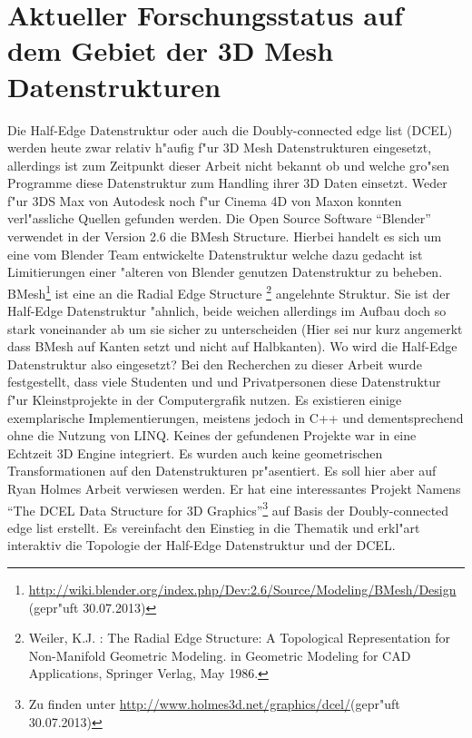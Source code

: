 \documentclass[pagesize, paper=a4, fontsize=12pt,titlepage=true, headings=small, headnosepline, abstractoff, liststotoc, nochapterprefix, plainheadsepline]{scrreprt}
\newcommand{\HES}{Half-Edge Datenstruktur }
\begin{document}
	\section {Aktueller Forschungsstatus auf dem Gebiet der 3D Mesh Datenstrukturen}
		Die \HES oder auch die Doubly-connected edge list (DCEL) werden heute zwar relativ h"aufig f"ur 3D Mesh Datenstrukturen eingesetzt, allerdings ist zum Zeitpunkt dieser Arbeit nicht bekannt ob und welche gro"sen Programme diese Datenstruktur zum Handling ihrer 3D Daten einsetzt. Weder f"ur 3DS Max von Autodesk noch f"ur Cinema 4D von Maxon konnten verl"assliche Quellen gefunden werden. Die Open Source Software "`Blender"' verwendet in der Version 2.6 die BMesh Structure. Hierbei handelt es sich um eine vom Blender Team entwickelte Datenstruktur welche dazu gedacht ist Limitierungen einer "alteren von Blender genutzen Datenstruktur zu beheben. BMesh\footnote{\url{http://wiki.blender.org/index.php/Dev:2.6/Source/Modeling/BMesh/Design} (gepr"uft 30.07.2013)}  ist eine an die Radial Edge Structure \footnote{Weiler, K.J. : The Radial Edge Structure: A Topological Representation for Non-Manifold Geometric Modeling. in Geometric Modeling for CAD Applications, Springer Verlag, May 1986.} angelehnte Struktur. Sie ist der \HES "ahnlich, beide weichen allerdings im Aufbau doch so stark voneinander ab um sie sicher zu unterscheiden (Hier sei nur kurz angemerkt dass BMesh auf Kanten setzt und nicht auf Halbkanten). Wo wird die \HES also eingesetzt? Bei den Recherchen zu dieser Arbeit wurde festgestellt, dass viele Studenten und und Privatpersonen diese Datenstruktur f"ur Kleinstprojekte in der Computergrafik nutzen. Es existieren einige exemplarische Implementierungen, meistens jedoch in C++ und dementsprechend ohne die Nutzung von LINQ. Keines der gefundenen Projekte war in eine Echtzeit 3D Engine integriert. Es wurden auch keine geometrischen Transformationen auf den Datenstrukturen pr"asentiert. Es soll hier aber auf Ryan Holmes Arbeit \cite{Holmes.2012} verwiesen werden. Er hat eine interessantes Projekt Namens "`The DCEL Data Structure for 3D Graphics"'\footnote{Zu finden unter \url{http://www.holmes3d.net/graphics/dcel/}(gepr"uft 30.07.2013)} auf Basis der Doubly-connected edge list erstellt. Es vereinfacht den Einstieg in die Thematik und erkl"art interaktiv die Topologie der \HES und der DCEL.
\newline
\end{document}
